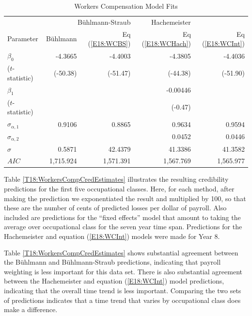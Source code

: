 \begin{table}[h]
 \caption{\label{T18:WorkersCompModelFits} Workers
Compensation Model Fits}
\begin{tabular}{lrrrr}\hline
    &   \multicolumn{2}{r}{B\"{u}hlmann-Straub} & Hachemeister \\
Parameter & B\"{u}hlmann & Eq (\ref{E18:WCBS}) &Eq (\ref{E18:WCHach}) & Eq (\ref{E18:WCInt}) \\
\hline
$\beta_0 $ & -4.3665 &  -4.4003&  -4.3805& -4.4036 \\
($t$-statistic) & (-50.38)& (-51.47) & (-44.38)& (-51.90) \\
$\beta_1 $    & & & -0.00446& \\
($t$-statistic) & & & (-0.47)  \\ \hline
$\sigma_{\alpha,1} $ &0.9106 &  0.8865 & 0.9634 & 0.9594\\
$\sigma_{\alpha,2} $ & &   & 0.0452 & 0.0446\\
$\sigma $ & 0.5871& 42.4379& 41.3386 & 41.3582\\\hline
$AIC $ & 1,715.924 & 1,571.391& 1,567.769&1,565.977 \\
\hline
\end{tabular}
\end{table}


Table \ref{T18:WorkersCompCredEstimates} illustrates the resulting
credibility predictions for the first five occupational classes.
Here, for each method, after making the prediction we exponentiated
the result and multiplied by 100, so that these are the number of
cents of predicted losses per dollar of payroll. Also included are
predictions for the ``fixed effects'' model that amount to taking
the average over occupational class for the seven year time span.
Predictions for the Hachemeister and equation (\ref{E18:WCInt})
models were made for Year 8.

Table \ref{T18:WorkersCompCredEstimates} shows substantial agreement
between the B\"{u}hlmann and B\"{u}hlmann-Straub predictions,
indicating that payroll weighting is less important for this data
set. There is also substantial agreement between the Hachemeister
and equation (\ref{E18:WCInt}) model predictions, indicating that
the overall time trend is less important. Comparing the two sets of
predictions indicates that a time trend that varies by occupational
class does make a difference.


